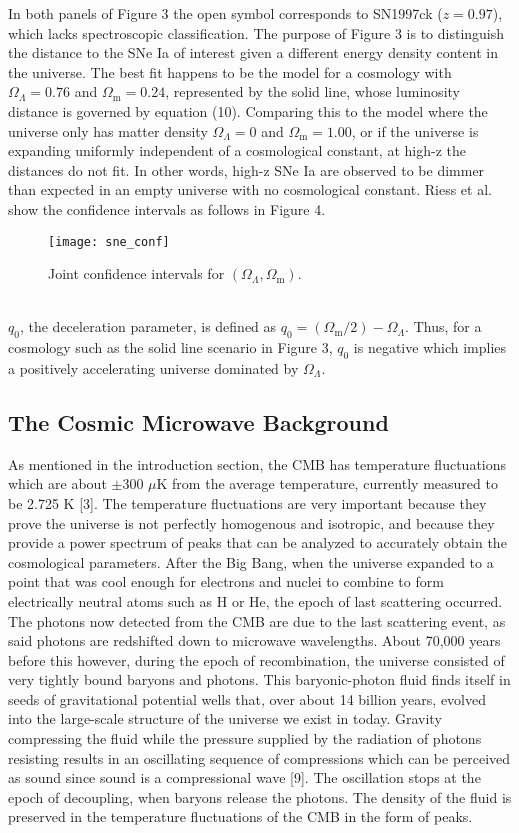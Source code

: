 \documentclass[12pt]{article}
\begin{document}
\noindent In both panels of Figure 3 the open symbol corresponds to SN1997ck ($z=0.97$), which lacks spectroscopic classification. The purpose of Figure 3 is to distinguish the distance to the SNe Ia of interest given a different energy density content in the universe. The best fit happens to be the model for a cosmology with $\Omega_\Lambda=0.76$ and $\Omega_\text{m}=0.24$, represented by the solid line, whose luminosity distance is governed by equation (10). Comparing this to the model where the universe only has matter density $\Omega_\Lambda=0$ and $\Omega_\text{m}=1.00$, or if the universe is expanding uniformly independent of a cosmological constant, at high-z the distances do not fit. In other words, high-z SNe Ia are observed to be dimmer than expected in an empty universe with no cosmological constant. Riess et al. show the confidence intervals as follows in Figure 4.
\\
\begin{figure}[h]
    \centering
    \texttt{[image: sne\_conf]}
    \caption{Joint confidence intervals for $(\Omega_\Lambda, \Omega_\text{m})$.  }
    \label{fig:mesh1}
\end{figure}
\\
$q_0$, the deceleration parameter, is defined as $q_0=(\Omega_\text{m}/2)-\Omega_\Lambda$. Thus, for a cosmology such as the solid line scenario in Figure 3, $q_0$ is negative which implies a positively accelerating universe dominated by $\Omega_\Lambda$.

\subsection{The Cosmic Microwave Background}
	
As mentioned in the introduction section, the CMB has temperature fluctuations which are about $\pm$300 $\mu$K from the average temperature, currently measured to be 2.725 K [3]. The temperature fluctuations are very important because they prove the universe is not perfectly homogenous and isotropic, and because they provide a power spectrum of peaks that can be analyzed to accurately obtain the cosmological parameters. After the Big Bang, when the universe expanded to a point that was cool enough for electrons and nuclei to combine to form electrically neutral atoms such as H or He, the epoch of last scattering occurred. The photons now detected from the CMB are due to the last scattering event, as said photons are redshifted down to microwave wavelengths. About 70,000 years before this however, during the epoch of recombination, the universe consisted of very tightly bound baryons and photons. This baryonic-photon fluid finds itself in seeds of gravitational potential wells that, over about 14 billion years, evolved into the large-scale structure of the universe we exist in today. Gravity compressing the fluid while the pressure supplied by the radiation of photons resisting results in an oscillating sequence of compressions which can be perceived as sound since sound is a compressional wave [9]. The oscillation stops at the epoch of decoupling, when baryons release the photons. The density of the fluid is preserved in the temperature fluctuations of the CMB in the form of peaks. 
\end{document}
